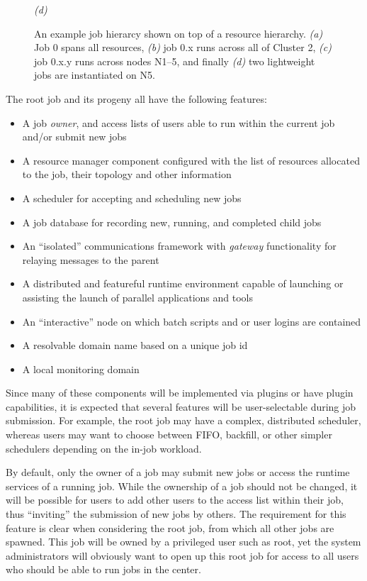 \documentclass{article}
\begin{document}
\begin{figure}
\begin{minipage}{0.5\linewidth}
\begin{center}
  {\em (d)}
  \end{center}
\end{minipage}
\label{fig:JobHierarchy}
\caption[Job Hierarchy Example]{{\small An example job hierarcy shown on top
of a resource hierarchy.
{\em (a)} Job 0 spans all resources,
{\em (b)} job 0.x runs across all of {\sc Cluster 2},
{\em (c)} job 0.x.y runs across nodes N1--5, and finally
{\em (d)} two lightweight jobs are instantiated on N5.}}
\end{figure}

The root job and its progeny all have the following features:

\begin{itemize}
\item{A job {\em owner}, and access lists of users able to run
      within the  current job and/or submit new jobs}
\item{A resource manager component configured with the list of
      resources allocated to the job, their topology and other information}
\item{A scheduler for accepting and scheduling new jobs}
\item{A job database for recording new, running, and completed child jobs}
\item{An ``isolated'' communications framework with {\em gateway} functionality
      for relaying messages to the parent}
\item{A distributed and featureful runtime environment capable of launching
      or assisting the launch of parallel applications and tools}
\item{An ``interactive'' node on which batch scripts and or user logins
       are contained}
\item{A resolvable domain name based on a unique job id}
\item{A local monitoring domain}
\end{itemize}

Since many of these components will be implemented via plugins or
have plugin capabilities, it is expected that several features will
be user-selectable during job submission. For example, the root
job may have a complex, distributed scheduler, whereas users may
want to choose between FIFO, backfill, or other simpler schedulers
depending on the in-job workload.

By default, only the owner of a job may submit new jobs or access
the runtime services of a running job.  While the ownership of a job
should not be changed, it will be possible for users to add other
users to the access list within their job, thus ``inviting'' the
submission of new jobs by others. The requirement for this feature
is clear when considering the root job, from which all other jobs
are spawned. This job will be owned by a privileged user such as
root, yet the system administrators will obviously want to open
up this root job for access to all users who should be able to
run jobs in the center.
\end{document}
